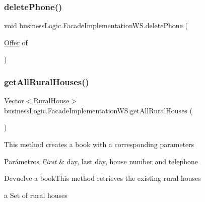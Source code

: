 \mbox{\label{classbusiness_logic_1_1_facade_implementation_w_s_ab3efd0077bc3ffd21e78cf2fb9f8709c}} 
\subsubsection{\texorpdfstring{deletePhone()}{deletePhone()}}
{\footnotesize\ttfamily void business\+Logic.\+Facade\+Implementation\+W\+S.\+delete\+Phone (\begin{DoxyParamCaption}\item[{\mbox{\hyperlink{classdomain_1_1_offer}{Offer}}}]{of }\end{DoxyParamCaption})}

\mbox{\label{classbusiness_logic_1_1_facade_implementation_w_s_aa6f21ddb40ca6cd752a13e31ff016e7e}} 
\subsubsection{\texorpdfstring{getAllRuralHouses()}{getAllRuralHouses()}}
{\footnotesize\ttfamily Vector$<$\mbox{\hyperlink{classdomain_1_1_rural_house}{Rural\+House}}$>$ business\+Logic.\+Facade\+Implementation\+W\+S.\+get\+All\+Rural\+Houses (\begin{DoxyParamCaption}{ }\end{DoxyParamCaption})}

This method creates a book with a corresponding parameters


\begin{DoxyParams}{Parámetros}
{\em First} & day, last day, house number and telephone \\
\hline
\end{DoxyParams}
\begin{DoxyReturn}{Devuelve}
a book\+This method retrieves the existing rural houses

a Set of rural houses 
\end{DoxyReturn}



